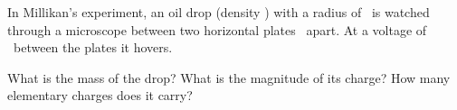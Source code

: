 In Millikan's experiment, an oil drop (density \densO) with a radius of \rdO\ is watched through a microscope between two horizontal plates \dpO\ apart. At a voltage of \UO\ between the plates it hovers.

\begin{abcliste}
\abc What is the mass of the drop?
\abc What is the magnitude of its charge?
\abc How many elementary charges does it carry?
\end{abcliste}
